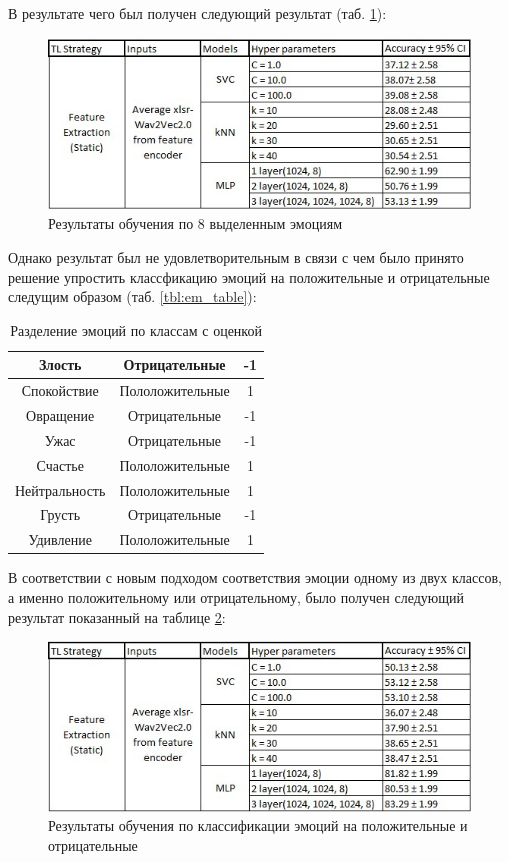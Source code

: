 В результате чего был получен следующий результат (таб. \ref{pic:table}): 

\begin{figure}[h]
\includegraphics[width=0.75\columnwidth]{./img/table_all_em.jpg}
\centering
\caption{Результаты обучения по 8 выделенным эмоциям}
\label{pic:table}
\end{figure}

Однако результат был не удовлетворительным в связи с чем было принято решение 
упростить классфикацию эмоций на положительные и отрицательные следущим образом (таб. \ref{tbl:em_table}):

\begin{table}[H]
\caption{Разделение эмоций по классам с оценкой}
\label{tbl:text_a00}
\begin{center}

\begin{tabular}{ | c | c | c | }
  \hline
  Злость & Отрицательные & -1 \\ \hline 
  Спокойствие & Пололожительные & 1 \\ \hline 
  Овращение & Отрицательные & -1 \\ \hline 
  Ужас & Отрицательные & -1 \\ \hline 
  Счастье & Пололожительные & 1 \\ \hline 
  Нейтральность & Пололожительные & 1 \\ \hline 
  Грусть & Отрицательные & -1 \\ \hline 
  Удивление & Пололожительные & 1 \\ \hline 
\end{tabular}
\end{center}
\end{table}

В соответствии с новым подходом соответствия эмоции одному из двух классов, а именно 
положительному или отрицательному, было получен следующий результат показанный на таблице \ref{pic:table2}:

\begin{figure}[h]
\includegraphics[width=0.75\columnwidth]{./img/table_2_em.jpg}
\centering
\caption{Результаты обучения по классификации эмоций на положительные и отрицательные}
\label{pic:table2}
\end{figure}

